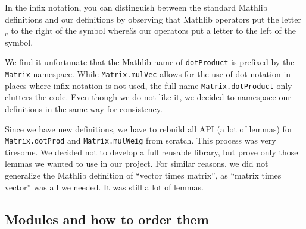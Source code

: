 \documentclass[]{article}
\renewcommand{\.}{\hskip .75pt}
\begin{document}
In the infix notation, you can distinguish between the standard
Mathlib definitions and our definitions by observing that Mathlib
operators put the letter $_v$ to the right of the symbol whereäs
our operators put a letter to the left of the symbol.

We find it unfortunate that the Mathlib name of \texttt{dotProduct}
is prefixed by the \texttt{Matrix} namespace.
While \texttt{Matrix.mulVec} allows for the use of dot notation
in places where infix notation is not used, the full name
\texttt{Matrix.dotProduct} only clutters the code.
Even though we do not like it, we decided to namespace our definitions
in the same way for consistency.

Since we have new definitions, we have to rebuild all API (a lot of lemmas)
for \texttt{Matrix.dotProd} and \texttt{Matrix.mulWeig} from scratch.
This process was very tiresome. We decided not to develop a full reusable
library, but prove only those lemmas we wanted to use in our project.
For similar reasons, we did not generalize the Mathlib definition of
``vector times matrix'', as ``matrix times vector'' was all we needed.
It was still a lot of lemmas.

\subsection{Modules and how to order them}
\label{preliminaries-modules}
\end{document}
